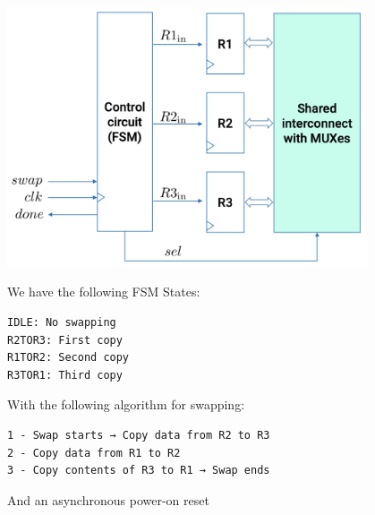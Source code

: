\documentclass[12pt,openany]{book}
\begin{document}
\begin{minipage}[htp]{0.6\textwidth}
	\begin{center}
		\includegraphics[width=0.8\textwidth]{circuits/18.1.2.png}
	\end{center}
\end{minipage}
\hfill
\vline
\hfill
\begin{minipage}[htp]{0.3\textwidth}
We have the following FSM States:
\begin{verbatim}
IDLE: No swapping
R2TOR3: First copy
R1TOR2: Second copy
R3TOR1: Third copy
\end{verbatim}	
\end{minipage}
\newline
With the following algorithm for swapping:
\begin{verbatim}
1 - Swap starts → Copy data from R2 to R3
2 - Copy data from R1 to R2
3 - Copy contents of R3 to R1 → Swap ends
\end{verbatim}
And an asynchronous power-on reset
\end{document}
